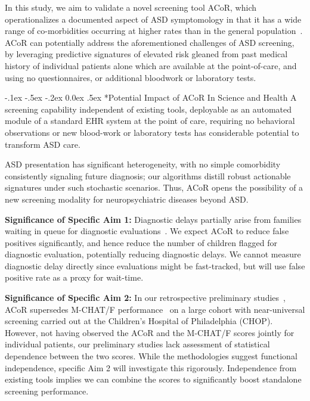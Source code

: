 \documentclass[onecolumn, compsoc,11pt]{IEEEtran}
\makeatletter
\renewcommand\paragraph{\@startsection {section}{1}{\z@}%
                                   {-.1ex \@plus -.5ex \@minus -.2ex}%
                                   {0.0ex \@plus.5ex}%
                                   {\fontsize{11}{10}\selectfont\bfseries\itshape\sffamily\color{black}}}
\def\ZERO{ACoR\xspace}
\def\acor{ACoR\xspace}
\makeatother
\begin{document}
In this study, we aim to validate a novel screening tool \acor, which operationalizes a documented aspect of ASD symptomology in  that it has   a wide range  of co-morbidities occurring at  higher rates than in the general population~\cite{hyman2020identification}.
\acor  can potentially address the aforementioned   challenges of ASD screening, by leveraging predictive signatures of  elevated risk gleaned from past medical history of individual  patients alone which are available at the point-of-care, and using no questionnaires, or additional bloodwork or laboratory tests. %

\paragraph*{Potential  Impact  of  \ZERO In Science and Health}
A  screening capability  independent of existing tools, deployable as an automated module  of a standard EHR system at the point of care, requiring no behavioral observations or  new blood-work or laboratory tests has considerable  potential to transform ASD care. 

ASD presentation has significant heterogeneity, with no simple comorbidity  consistently signaling future  diagnosis; our algorithms distill robust actionable signatures under such stochastic scenarios. Thus,  \acor opens the possibility of a new screening modality for  neuropsychiatric diseases beyond ASD.

\textbf{Significance of Specific Aim 1:} 
Diagnostic delays partially arise from families waiting in queue for diagnostic evaluations~\cite{gordon2016whittling}. 
We expect \ZERO to reduce  false positives significantly, and hence  reduce the number of children  flagged for diagnostic evaluation,  potentially  reducing diagnostic delays. We cannot measure diagnostic delay directly  since evaluations might be fast-tracked, but will use false positive rate as a proxy for wait-time. 

\textbf{Significance of Specific Aim 2:} 
In our retrospective  preliminary studies~\cite{Onishchenko_2021},  \ZERO supersedes M-CHAT/F  performance~\cite{pmid31562252} on a large  cohort with near-universal screening carried out at the Children's Hospital of Philadelphia (CHOP). However, not having observed the \ZERO and the M-CHAT/F scores jointly for individual patients, our preliminary studies lack  assessment of statistical dependence between the two scores. While the  methodologies  suggest functional independence, specific Aim 2 will investigate this rigorously. Independence from existing tools implies  we can   combine the scores to significantly boost standalone  screening performance.
\end{document}
